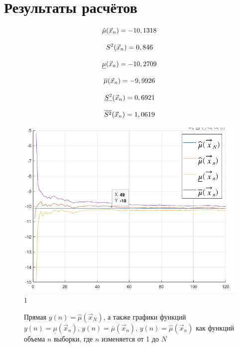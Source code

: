 \documentclass[12pt]{report}
\begin{document}
\section*{Результаты расчётов}
\begin{equation*}
	\hat\mu(\vec x_n) = -10,1318\\
\end{equation*}

\begin{equation*}
	S^2(\vec x_n) = 0,846\\
\end{equation*}

\begin{equation*}
	\underline\mu(\vec x_n) = -10,2709\\
\end{equation*}

\begin{equation*}
	\overline\mu(\vec x_n) = -9,9926\\
\end{equation*}

\begin{equation*}
	\underline{S^2}(\vec x_n) = 0,6921\\
\end{equation*}

\begin{equation*}
	\overline{S^2}(\vec x_n) = 1,0619\\
\end{equation*}

\begin{figure}[h]
	\centering
	\includegraphics[scale=0.5]{img/1.png}1
	\caption{Прямая $y(n) = \hat\mu(\vec x_N)$, а также графики функций $y(n) = \underline\mu(\vec x_n)$, $y(n) = \overline\mu(\vec x_n)$, $y(n) = \hat\mu(\vec x_n)$ как функций объема $n$ выборки, где $n$ изменяется от 1 до $N$}
	\label{fig:1}
\end{figure}
\end{document}
